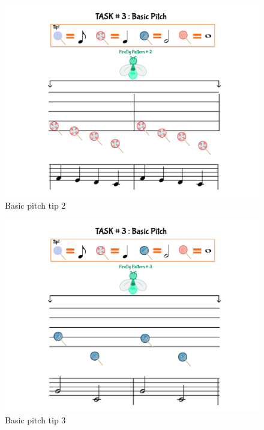 \begin{figure}[H]
    \centering
    \includegraphics[width=12cm]{figures/NewFigures/BasicPitchTip2.png}
    \caption{Basic pitch tip 2}
    \label{fig:BasicPitchTip2}
\end{figure}

\begin{figure}[H]
    \centering
    \includegraphics[width=12cm]{figures/NewFigures/BasicPitchTip3.png}
    \caption{Basic pitch tip 3}
    \label{fig:BasicPitchTip3}
\end{figure}

